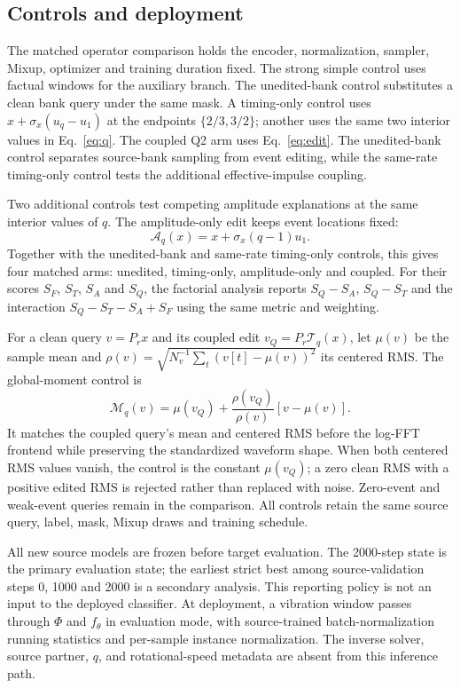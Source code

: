\subsection{Controls and deployment}
The matched operator comparison holds the encoder, normalization, sampler, Mixup,
optimizer and training duration fixed. The strong simple control uses
factual windows for the auxiliary branch. The unedited-bank control
substitutes a clean bank query under the same mask. A timing-only control
uses $x+\sigma_x(u_q-u_1)$ at the endpoints $\{2/3,3/2\}$; another uses
the same two interior values in Eq.~\eqref{eq:q}. The coupled Q2 arm uses
Eq.~\eqref{eq:edit}. The unedited-bank control separates source-bank
sampling from event editing, while the same-rate timing-only control
tests the additional effective-impulse coupling.

Two additional controls test competing amplitude explanations at the same
interior values of $q$. The amplitude-only edit keeps event locations fixed:
\begin{equation}
 \mathcal A_q(x)=x+\sigma_x(q-1)u_1.
 \label{eq:amplitude-control}
\end{equation}
Together with the unedited-bank and same-rate timing-only controls,
this gives four matched arms: unedited, timing-only, amplitude-only and
coupled. For their scores $S_F$, $S_T$, $S_A$ and $S_Q$, the factorial
analysis reports $S_Q-S_A$, $S_Q-S_T$ and the interaction
$S_Q-S_T-S_A+S_F$ using the same metric and weighting.

For a clean query $v=P_rx$ and its coupled edit
$v_Q=P_r\mathcal T_q(x)$, let $\mu(v)$ be the sample mean and
$\rho(v)=\sqrt{N_v^{-1}\sum_t(v[t]-\mu(v))^2}$ its centered RMS.
The global-moment control is
\begin{equation}
 \mathcal M_q(v)=\mu(v_Q)+\frac{\rho(v_Q)}{\rho(v)}[v-\mu(v)].
 \label{eq:moment-control}
\end{equation}
It matches the coupled query's mean and centered RMS before the log-FFT
frontend while preserving the standardized waveform shape. When both
centered RMS values vanish, the control is the constant $\mu(v_Q)$;
a zero clean RMS with a positive edited RMS is rejected rather than
replaced with noise. Zero-event and weak-event queries remain in the
comparison. All controls retain the same source query, label, mask,
Mixup draws and training schedule.

All new source models are frozen before target evaluation.
The 2000-step state is the primary evaluation state; the earliest strict
best among source-validation steps 0, 1000 and 2000 is a secondary analysis.
This reporting policy is not an input to the deployed classifier.
At deployment, a vibration window passes through $\Phi$ and
$f_\theta$ in evaluation mode, with source-trained batch-normalization
running statistics and per-sample instance normalization. The inverse
solver, source partner, $q$, and rotational-speed
metadata are absent from this inference path.
